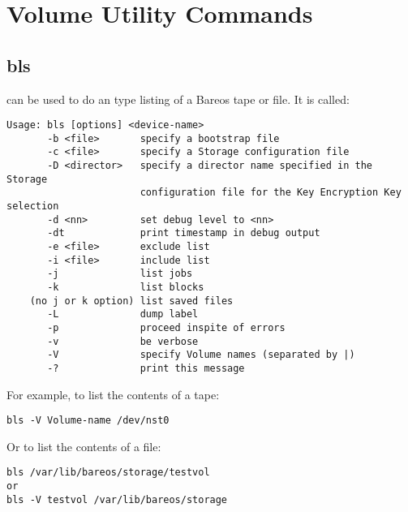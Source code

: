 \section{Volume Utility Commands}
    \label{sec:VolumeUtilityCommands}


\subsection{bls}
\label{bls}

 can be used to do an  type listing of a Bareos tape or
file. It is called:

\footnotesize
\begin{verbatim}
Usage: bls [options] <device-name>
       -b <file>       specify a bootstrap file
       -c <file>       specify a Storage configuration file
       -D <director>   specify a director name specified in the Storage
                       configuration file for the Key Encryption Key selection
       -d <nn>         set debug level to <nn>
       -dt             print timestamp in debug output
       -e <file>       exclude list
       -i <file>       include list
       -j              list jobs
       -k              list blocks
    (no j or k option) list saved files
       -L              dump label
       -p              proceed inspite of errors
       -v              be verbose
       -V              specify Volume names (separated by |)
       -?              print this message
\end{verbatim}
\normalsize

For example, to list the contents of a tape:

\footnotesize
\begin{verbatim}
bls -V Volume-name /dev/nst0
\end{verbatim}
\normalsize

Or to list the contents of a file:

\footnotesize
\begin{verbatim}
bls /var/lib/bareos/storage/testvol
or
bls -V testvol /var/lib/bareos/storage
\end{verbatim}
\normalsize

